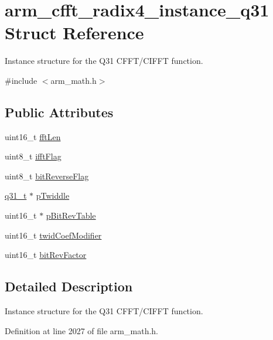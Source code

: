 \hypertarget{structarm__cfft__radix4__instance__q31}{}\section{arm\+\_\+cfft\+\_\+radix4\+\_\+instance\+\_\+q31 Struct Reference}
\label{structarm__cfft__radix4__instance__q31}


Instance structure for the Q31 C\+F\+F\+T/\+C\+I\+F\+FT function.  




{\ttfamily \#include $<$arm\+\_\+math.\+h$>$}

\subsection*{Public Attributes}
\begin{DoxyCompactItemize}
\item 
uint16\+\_\+t \hyperlink{structarm__cfft__radix4__instance__q31_ab413d2a5d3f45fa187d93813bf3bf81b}{fft\+Len}
\item 
uint8\+\_\+t \hyperlink{structarm__cfft__radix4__instance__q31_adc0a62ba669ad2282ecbe43d5d96abab}{ifft\+Flag}
\item 
uint8\+\_\+t \hyperlink{structarm__cfft__radix4__instance__q31_a5a7c4f4c7b3fb655cbb2bc11ef160a2a}{bit\+Reverse\+Flag}
\item 
\hyperlink{arm__math_8h_adc89a3547f5324b7b3b95adec3806bc0}{q31\+\_\+t} $\ast$ \hyperlink{structarm__cfft__radix4__instance__q31_a561c22dee4cbdcfa0fd5f15106ecc306}{p\+Twiddle}
\item 
uint16\+\_\+t $\ast$ \hyperlink{structarm__cfft__radix4__instance__q31_a33a3bc774c97373261699463c05dfe54}{p\+Bit\+Rev\+Table}
\item 
uint16\+\_\+t \hyperlink{structarm__cfft__radix4__instance__q31_a8cf8187b8232815cf17ee82bf572ecf9}{twid\+Coef\+Modifier}
\item 
uint16\+\_\+t \hyperlink{structarm__cfft__radix4__instance__q31_a94d2fead4efa4d5eaae142bbe30b0e15}{bit\+Rev\+Factor}
\end{DoxyCompactItemize}


\subsection{Detailed Description}
Instance structure for the Q31 C\+F\+F\+T/\+C\+I\+F\+FT function. 

Definition at line 2027 of file arm\+\_\+math.\+h.




